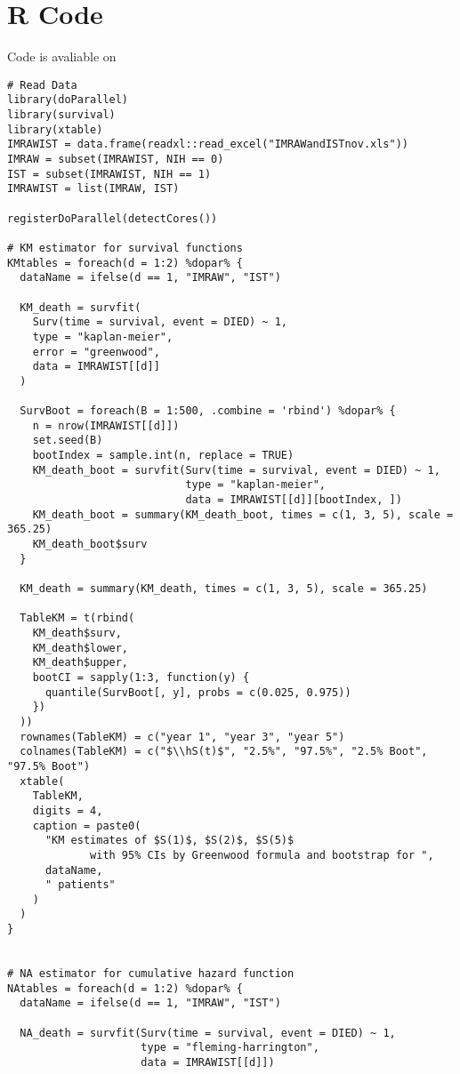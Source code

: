 \documentclass[11pt]{article}
\newcommand{\hS}{\hat{S}}
\begin{document}
\appendix

\section{R Code}

Code is avaliable on 

\begin{lstlisting}
# Read Data
library(doParallel)
library(survival)
library(xtable)
IMRAWIST = data.frame(readxl::read_excel("IMRAWandISTnov.xls"))
IMRAW = subset(IMRAWIST, NIH == 0)
IST = subset(IMRAWIST, NIH == 1)
IMRAWIST = list(IMRAW, IST)

registerDoParallel(detectCores())

# KM estimator for survival functions
KMtables = foreach(d = 1:2) %dopar% {
  dataName = ifelse(d == 1, "IMRAW", "IST")
  
  KM_death = survfit(
    Surv(time = survival, event = DIED) ~ 1,
    type = "kaplan-meier",
    error = "greenwood",
    data = IMRAWIST[[d]]
  )
  
  SurvBoot = foreach(B = 1:500, .combine = 'rbind') %dopar% {
    n = nrow(IMRAWIST[[d]])
    set.seed(B)
    bootIndex = sample.int(n, replace = TRUE)
    KM_death_boot = survfit(Surv(time = survival, event = DIED) ~ 1,
                            type = "kaplan-meier",
                            data = IMRAWIST[[d]][bootIndex, ])
    KM_death_boot = summary(KM_death_boot, times = c(1, 3, 5), scale = 365.25)
    KM_death_boot$surv
  }
  
  KM_death = summary(KM_death, times = c(1, 3, 5), scale = 365.25)
  
  TableKM = t(rbind(
    KM_death$surv,
    KM_death$lower,
    KM_death$upper,
    bootCI = sapply(1:3, function(y) {
      quantile(SurvBoot[, y], probs = c(0.025, 0.975))
    })
  ))
  rownames(TableKM) = c("year 1", "year 3", "year 5")
  colnames(TableKM) = c("$\\hS(t)$", "2.5%", "97.5%", "2.5% Boot", "97.5% Boot")
  xtable(
    TableKM,
    digits = 4,
    caption = paste0(
      "KM estimates of $S(1)$, $S(2)$, $S(5)$
             with 95% CIs by Greenwood formula and bootstrap for ",
      dataName,
      " patients"
    )
  )
}


# NA estimator for cumulative hazard function
NAtables = foreach(d = 1:2) %dopar% {
  dataName = ifelse(d == 1, "IMRAW", "IST")
  
  NA_death = survfit(Surv(time = survival, event = DIED) ~ 1,
                     type = "fleming-harrington",
                     data = IMRAWIST[[d]])
  

\end{lstlisting}
\end{document}
